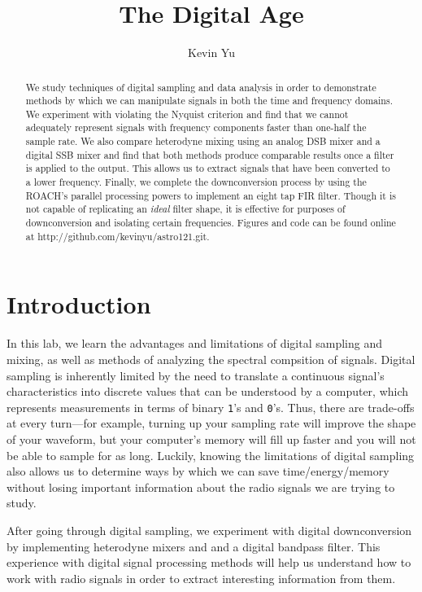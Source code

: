 \documentclass[12pt]{article}
\title{The Digital Age}
\author {
Kevin Yu
}
\begin{document}
\maketitle

\begin{abstract}
We study techniques of digital sampling and data analysis in order to demonstrate methods by which we can manipulate signals in both the time and frequency domains. We experiment with violating the Nyquist criterion and find that we cannot adequately represent signals with frequency components faster than one-half the sample rate. We also compare heterodyne mixing using an analog DSB mixer and a digital SSB mixer and find that both methods produce comparable results once a filter is applied to the output. This allows us to extract signals that have been converted to a lower frequency. Finally, we complete the downconversion process by using the ROACH's parallel processing powers to implement an eight tap FIR filter. Though it is not capable of replicating an \textit{ideal} filter shape, it is effective for purposes of downconversion and isolating certain frequencies. Figures and code can be found online at http://github.com/kevinyu/astro121.git. 
\end{abstract}

\section{Introduction}
In this lab, we learn the advantages and limitations of digital sampling and mixing, as well as methods of analyzing the spectral compsition of signals. Digital sampling is inherently limited by the need to translate a continuous signal's characteristics into discrete values that can be understood by a computer, which represents measurements in terms of binary \texttt{1}'s and \texttt{0}'s. Thus, there are trade-offs at every turn---for example, turning up your sampling rate will improve the shape of your waveform, but your computer's memory will fill up faster and you will not be able to sample for as long. Luckily, knowing the limitations of digital sampling also allows us to determine ways by which we can save time/energy/memory without losing important information about the radio signals we are trying to study.

After going through digital sampling, we experiment with digital downconversion by implementing heterodyne mixers and and a digital bandpass filter. This experience with digital signal processing methods will help us understand how to work with radio signals in order to extract interesting information from them.
\end{document}
